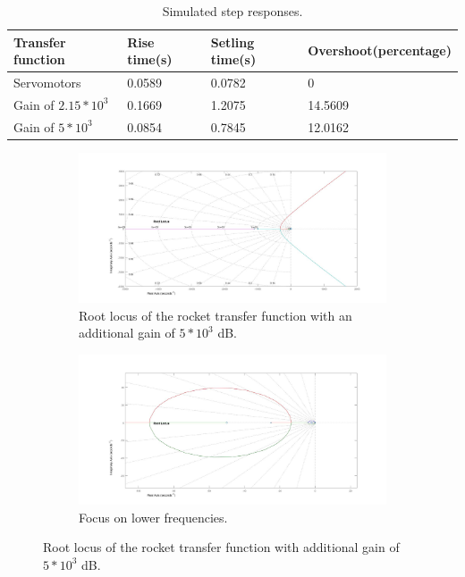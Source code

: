 \begin{table}[htbp]
	\centering
	\caption{Simulated step responses.}
	\label{tab:TableStepr}
	\begin{tabular}{llll}
		Transfer function & Rise time{(}s{)} & Setling time{(}s{)} & Overshoot{(}percentage{)} \\ \hline  \rowcolor{lightGrey}
		Servomotors     & 0.0589 & 0.0782 & 0\\  
		Gain of $2.15*10^3$     & 0.1669 & 1.2075 & 14.5609  \\  
		\rowcolor{lightGrey}           
		Gain of $5*10^3$     & 0.0854 & 0.7845 & 12.0162      \\     
	\end{tabular}
\end{table}

\begin{figure}[htbp]
	\centering
	\begin{subfigure}{0.45\textwidth}
		\includegraphics[width=\textwidth]{figures/Rocket/design/tf_with_controller_5}
		\caption{Root locus of the rocket transfer function with an additional gain of $5 * 10^3$ \si{\dB}.}
		\label{fig:FinalRocketTf}
	\end{subfigure}
	\begin{subfigure}{0.45\textwidth}
		\includegraphics[width=\textwidth]{figures/Rocket/design/tf_with_controller_5_zoom}
		\caption{Focus on lower frequencies.}
		\label{fig:FinalRocketTfZoom}
	\end{subfigure}
	\caption{Root locus of the rocket transfer function with additional gain of $5*10^3$ \si{\dB}.}	
\end{figure}


